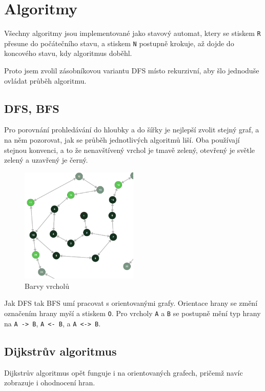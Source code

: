 \documentclass{article}
\def\code#1{\texttt{#1}}
\begin{document}
\section{Algoritmy}

Všechny algoritmy jsou implementované jako stavový automat, ktery se
stiskem \code{R} přesune do počátečního stavu, a stiskem \code{N} postupně
krokuje, až dojde do koncového stavu, kdy algoritmus doběhl.

Proto jsem zvolil zásobníkovou variantu DFS místo rekurzivní, aby šlo
jednoduše ovládat průběh algoritmu.

\subsection{DFS, BFS}

Pro porovnání prohledávání do hloubky a do šířky je nejlepší zvolit
stejný graf, a na něm pozorovat, jak se průběh jednotlivých algoritmů
liší. Oba používají stejnou konvenci, a to že nenavštívený vrchol je
tmavě zelený, otevřený je světle zelený a uzavřený je černý.

\begin{figure}
  \centering
    \includegraphics[width=0.5\textwidth]{CaAOrcu.png}
  \caption{Barvy vrcholů}
\end{figure}

Jak DFS tak BFS umí pracovat s orientovanými grafy. Orientace hrany se
změní označením hrany myší a stiskem \code{O}. Pro vrcholy \code{A} a \code{B} se
postupně mění typ hrany na \code{A -> B}, \code{A <- B}, a \code{A <-> B}.

\subsection{Dijkstrův algoritmus}

Dijkstrův algoritmus opět funguje i na orientovaných grafech, pričemž
navíc zobrazuje i ohodnocení hran.
\end{document}
